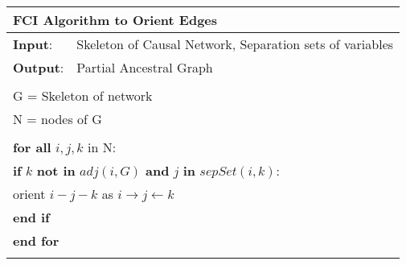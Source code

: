 \documentclass{article}
\begin{document}
\begin{table}[h!]
	\begin{tabular}{|l l|}
		\hline
		\multicolumn{2}{|l|}{FCI Algorithm to Orient Edges}\\ 
		\hline
		\textbf{Input}: & Skeleton of Causal Network, Separation sets of variables\\
		\textbf{Output}: & Partial Ancestral Graph\\
		&\\
		\multicolumn{2}{|l|}{G = Skeleton of network}\\
		\multicolumn{2}{|l|}{N = nodes of G}\\
		&\\
		\multicolumn{2}{|l|}{\textbf{for all} $ i,j,k $ in N:}\\
		\multicolumn{2}{|l|}{\quad\textbf{if} $ k $ \textbf{not in} $ adj(i,G) $ \textbf{and} $ j $ \textbf{in} $sepSet( i,k)$:}\\
		\multicolumn{2}{|l|}{\quad\quad orient $ i-j-k $ as $ i\rightarrow j \leftarrow k $ }\\
		\multicolumn{2}{|l|}{\quad\textbf{end if}}\\
		\multicolumn{2}{|l|}{\textbf{end for}}\\
		&\\
		

\end{tabular}
\end{table}
\end{document}
